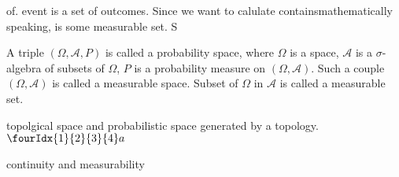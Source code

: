 \documentclass[10pt,a4paper]{book}
\begin{document}
of.  event is a set of outcomes. Since we want to calulate containsmathematically speaking, is some measurable set. S

A triple $ (\Omega, \mathcal{A},P) $ is called a probability space, where $ \Omega $ is a space, $ \mathcal{A} $ is a $ \sigma $-algebra of subsets of $ \Omega $, $ P $ is a probability measure on $ (\Omega, \mathcal{A}) $. Such a couple $ (\Omega, \mathcal{A}) $ is called a measurable space. Subset of $ \Omega $ in $ \mathcal{A} $ is called a measurable set.

topolgical space and probabilistic space generated by a topology. $ \fourIdx{1}{2}{3}{4}a $

continuity and measurability
\end{document}
